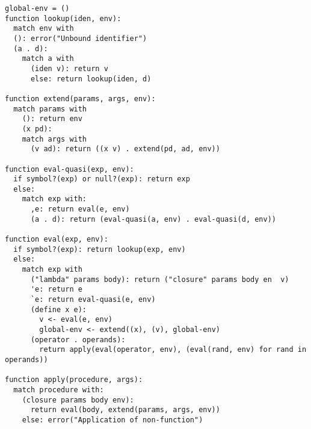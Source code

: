 \lstset{language=pseudo, showstringspaces=false,  breaklines=true}
\begin{lstlisting}[caption=An incomplete Scheme evaluator, label=evaluator]
global-env = ()
function lookup(iden, env):
  match env with
  (): error("Unbound identifier")
  (a . d):
    match a with
      (iden v): return v
      else: return lookup(iden, d)

function extend(params, args, env):
  match params with
    (): return env  
    (x pd):
    match args with
      (v ad): return ((x v) . extend(pd, ad, env))

function eval-quasi(exp, env):
  if symbol?(exp) or null?(exp): return exp
  else:
    match exp with:
      ,e: return eval(e, env)
      (a . d): return (eval-quasi(a, env) . eval-quasi(d, env))

function eval(exp, env):
  if symbol?(exp): return lookup(exp, env)
  else:
    match exp with
      ("lambda" params body): return ("closure" params body en  v)
      'e: return e
      `e: return eval-quasi(e, env)
      (define x e):
        v <- eval(e, env)
        global-env <- extend((x), (v), global-env)
      (operator . operands):
        return apply(eval(operator, env), (eval(rand, env) for rand in operands))

function apply(procedure, args):
  match procedure with:        
    (closure params body env):
      return eval(body, extend(params, args, env))
    else: error("Application of non-function")
\end{lstlisting}
\lstset{language=Scheme, showstringspaces=false, breaklines=true}